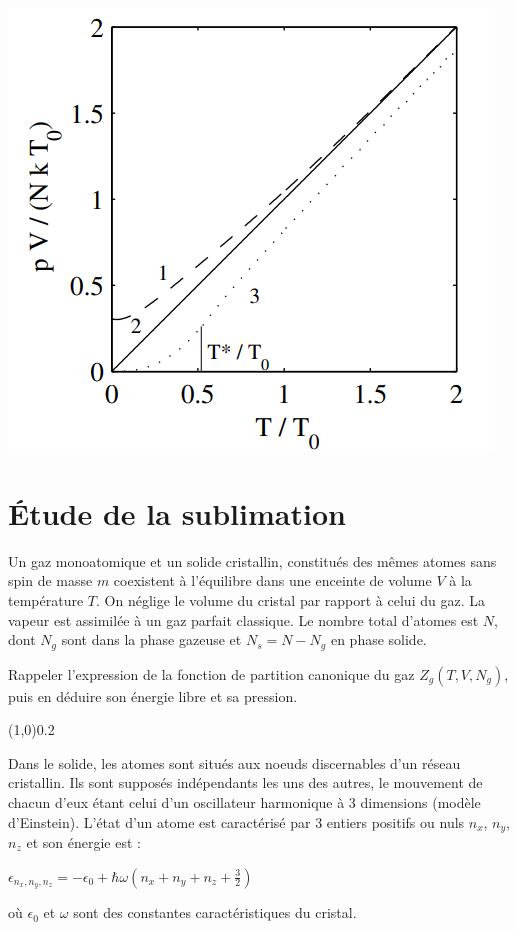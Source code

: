 \documentclass[utf8, 11pt]{feuille}
\begin{document}
\begin{center}
\includegraphics[scale=0.4]{TroisStatistiques.png}
\end{center}

\section{\'Etude de la sublimation}
Un gaz monoatomique et un solide cristallin, constitués des mêmes atomes sans spin de masse $m$ coexistent à l'équilibre dans une enceinte de volume $V$  à la température $T$. On néglige le volume du cristal par rapport à celui du gaz. La vapeur est assimilée à un gaz parfait classique. Le nombre total d’atomes est $N$, dont $N_g$ sont dans la phase gazeuse et $N_s=N-N_g$ en phase solide.

\question Rappeler l'expression de la fonction de partition canonique du gaz $Z_g(T, V, N_g)$, puis en déduire son énergie libre et sa pression. 

\begin{center} \vspace{-0.5cm}\line(1,0){0.2\textwidth} \vspace{-0.5cm}\end{center}

Dans le solide, les atomes sont situés aux noeuds discernables d’un réseau cristallin. Ils sont supposés indépendants
les uns des autres, le mouvement de chacun d’eux étant celui d’un oscillateur harmonique à 3 dimensions
(modèle d’Einstein). L'état d’un atome est caractérisé par 3 entiers positifs ou nuls $n_x$, $n_y$,
$n_z$ et son énergie est :
\begin{center}
$\epsilon_{{n_x,n_y,n_z}}=-\epsilon_0+\hbar \omega ( n_x+n_y+n_z+\frac{3}{2})$
\end{center}
où $\epsilon_0$ et $\omega$ sont des constantes caractéristiques du cristal.
\end{document}
